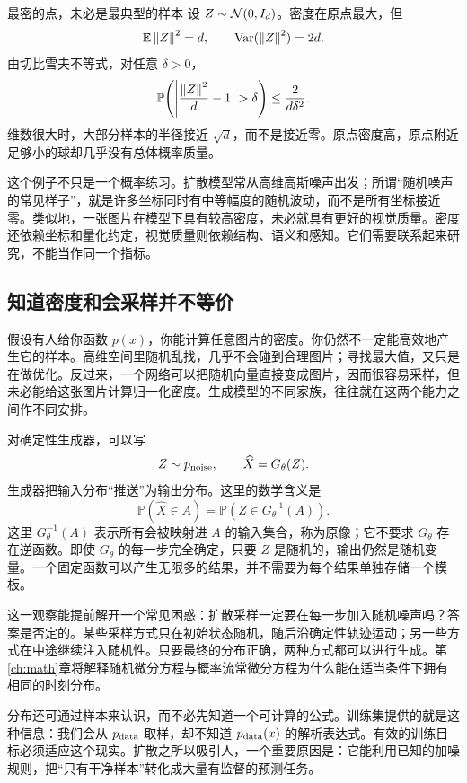\begin{examplebox}{最密的点，未必是最典型的样本}
设 $Z\sim\mathcal{N}(0,I_d)$。密度在原点最大，但
\[
  \mathbb{E}\left\lVert Z\right\rVert^2=d,\qquad
  \operatorname{Var}(\left\lVert Z\right\rVert^2)=2d.
\]
由切比雪夫不等式，对任意 $\delta>0$，
\[
 \mathbb P\!\left(\left|\frac{\norm{Z}^2}{d}-1\right|>\delta\right)
 \leq \frac{2}{d\delta^2}.
\]
维数很大时，大部分样本的半径接近 $\sqrt d$，而不是接近零。原点密度高，原点附近足够小的球却几乎没有总体概率质量。
\end{examplebox}

这个例子不只是一个概率练习。扩散模型常从高维高斯噪声出发；所谓“随机噪声的常见样子”，就是许多坐标同时有中等幅度的随机波动，而不是所有坐标接近零。类似地，一张图片在模型下具有较高密度，未必就具有更好的视觉质量。密度还依赖坐标和量化约定，视觉质量则依赖结构、语义和感知。它们需要联系起来研究，不能当作同一个指标。

\subsection{知道密度和会采样并不等价}

假设有人给你函数 $p(x)$，你能计算任意图片的密度。你仍然不一定能高效地产生它的样本。高维空间里随机乱找，几乎不会碰到合理图片；寻找最大值，又只是在做优化。反过来，一个网络可以把随机向量直接变成图片，因而很容易采样，但未必能给这张图片计算归一化密度。生成模型的不同家族，往往就在这两个能力之间作不同安排。

对确定性生成器，可以写
\[
 Z\sim p_{\mathrm{noise}},\qquad \widehat X=G_\theta(Z).
\]
生成器把输入分布“推送”为输出分布。这里的数学含义是
\[
 \mathbb P(\widehat X\in A)
 =\mathbb P\!\left(Z\in G_\theta^{-1}(A)\right).
\]
这里 $G_\theta^{-1}(A)$ 表示所有会被映射进 $A$ 的输入集合，称为原像；它不要求 $G_\theta$ 存在逆函数。即使 $G_\theta$ 的每一步完全确定，只要 $Z$ 是随机的，输出仍然是随机变量。一个固定函数可以产生无限多的结果，并不需要为每个结果单独存储一个模板。

这一观察能提前解开一个常见困惑：扩散采样一定要在每一步加入随机噪声吗？答案是否定的。某些采样方式只在初始状态随机，随后沿确定性轨迹运动；另一些方式在中途继续注入随机性。只要最终的分布正确，两种方式都可以进行生成。第\ref{ch:math}章将解释随机微分方程与概率流常微分方程为什么能在适当条件下拥有相同的时刻分布。

分布还可通过样本来认识，而不必先知道一个可计算的公式。训练集提供的就是这种信息：我们会从 $p_{\mathrm{data}}$ 取样，却不知道 $p_{\mathrm{data}}(x)$ 的解析表达式。有效的训练目标必须适应这个现实。扩散之所以吸引人，一个重要原因是：它能利用已知的加噪规则，把“只有干净样本”转化成大量有监督的预测任务。

